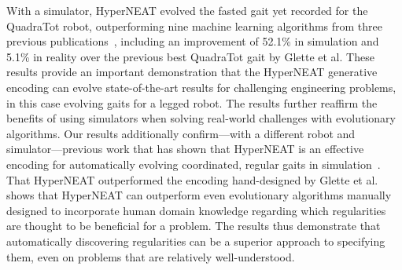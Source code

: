
With a simulator, HyperNEAT evolved the fasted gait yet recorded for the QuadraTot robot, outperforming nine machine learning algorithms from three previous publications~\cite{yos:clune,glette,haocheng}, including an improvement of 52.1\% in simulation and 5.1\% in reality over the previous best QuadraTot gait by Glette et al. These results provide an important demonstration that the HyperNEAT generative encoding can evolve state-of-the-art results for challenging engineering problems, in this case evolving gaits for a legged robot. The results further reaffirm the benefits of using simulators when solving real-world challenges with evolutionary algorithms. Our results additionally confirm---with a different robot and simulator---previous work that has shown that HyperNEAT is an effective encoding for automatically evolving coordinated, regular gaits in simulation~\cite{yos:clune,clune2011performance,clune2009evolving}. That HyperNEAT outperformed the encoding hand-designed by Glette et al. shows that HyperNEAT can outperform even evolutionary algorithms manually designed to incorporate human domain knowledge regarding which regularities are thought to be beneficial for a problem. The results thus demonstrate that automatically discovering regularities can be a superior approach to specifying them, even on problems that are relatively well-understood. 
